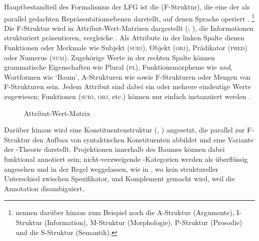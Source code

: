 Hauptbestandteil des Formalismus der LFG ist die 
(F-Struktur), die eine der als parallel gedachten Repräsentationsebenen
darstellt, auf denen Sprache operiert \autocite[840--844]{buttking2015}.%
%
	\footnote{\citet[862--865]{buttking2015} nennen darüber hinaus zum Beispiel
		noch die
		A-Struktur (Argumente),
		I-Struktur (Information),
		M-Struktur (Morphologie),
		P-Struktur (Prosodie)
		und die
		S-Struktur (Semantik).
	}
%
Die F-Struktur wird in
Attribut-Wert-Matrizen dargestellt
(;
\cites[vgl.][44--45]{bresnanetal2016}[207--221]{mueller2023}), die
Informationen strukturiert präsentieren, vergleiche . Als
Attribute in der linken Spalte dienen Funktionen oder Merkmale wie
Subjekt (\textsc{subj}), Objekt (\textsc{obj}), Prädikator (\textsc{pred}) oder
Numerus (\textsc{num}). Zugehörige Werte in der rechten Spalte können
grammatische Eigenschaften wie Plural (\textsc{pl}), Funktionsmorpheme wie
\textit{und}, Wortformen wie `Baum', A-Strukturen wie
 sowie F-Strukturen oder Mengen von F-Struk\-turen sein. Jedem
Attribut sind dabei ein oder mehrere eindeutige Werte zugewiesen;
Funktionen (\textsc{subj}, \textsc{obj}, etc.) können nur einfach instanziiert
werden \autocite[vgl.][44--58]{bresnanetal2016}.

\begin{figure}
\centering
	{%
	}
\caption{Attribut-Wert-Matrix \autocite[nach][209]{mueller2023}}
\label{fig:avm}
\end{figure}

Darüber hinaus wird eine Konstituentenstruktur (,
) angesetzt, die parallel zur F-Struktur den Aufbau von syntaktischen Konstituenten abbildet und eine Variante
der -Theorie \autocites{chomsky1970,jackendoff1977} darstellt.
Projektionen innerhalb des Baumes können dabei funktional annotiert sein;
nicht-verzweigende -Kategorien werden als überflüssig angesehen und in
der Regel weggelassen, wie in , wo kein struktureller
Unterschied zwischen Spezifikator,  und Komplement gemacht wird,
weil die Annotation disambiguiert.


